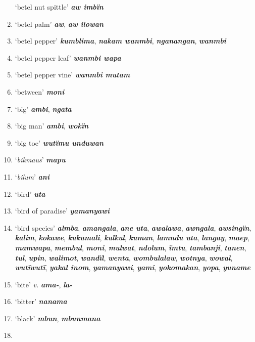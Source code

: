 \begin{enumerate}[noitemsep, label={}, align=left, widest=190, labelsep=1ex,leftmargin=*,itemindent=-10pt]
‘betel nut spittle’ \textbf{\textit{aw imbïn}} \item
‘betel palm’ \textbf{\textit{aw}}, \textbf{\textit{aw ilowan}} \item
‘betel pepper’ \textbf{\textit{kumblima}}, \textbf{\textit{nakam wanmbi}}, \textbf{\textit{nganangan}}, \textbf{\textit{wanmbi}} \item
‘betel pepper leaf’ \textbf{\textit{wanmbi wapa}} \item
‘betel pepper vine’ \textbf{\textit{wanmbi mutam}} \item
‘between’ \textbf{\textit{moni}} \item
‘big’ \textbf{\textit{ambi}}, \textbf{\textit{ngata}} \item
‘big man’ \textbf{\textit{ambi}}, \textbf{\textit{wokïn}} \item
‘big toe’ \textbf{\textit{wutïmu unduwan}} \item
‘\textit{bikmaus}’ \textbf{\textit{mapu}} \item
‘\textit{bilum}’ \textbf{\textit{ani}} \item
‘bird’ \textbf{\textit{uta}} \item
‘bird of paradise’ \textbf{\textit{yamanyawi}} \item
‘bird species’ \textbf{\textit{almba}}, \textbf{\textit{amangala}}, \textbf{\textit{ane uta}}, \textbf{\textit{awalawa}}, \textbf{\textit{awngala}}, \textbf{\textit{awsingïn}}, \linebreak \textbf{\textit{kalim}}, \textbf{\textit{kokawe}}, \textbf{\textit{kukumali}}, \textbf{\textit{kulkul}}, \textbf{\textit{kuman}}, \textbf{\textit{lamndu uta}}, \textbf{\textit{langay}}, \textbf{\textit{maep}}, \textbf{\textit{mamwapa}}, \textbf{\textit{membul}}, \textbf{\textit{moni}}, \textbf{\textit{mulwat}}, \textbf{\textit{ndolum}}, \textbf{\textit{ïmtu}}, \textbf{\textit{tambanji}}, \textbf{\textit{tanen}}, \textbf{\textit{tul}}, \textbf{\textit{upin}}, \textbf{\textit{walimot}}, \textbf{\textit{wandïl}}, \textbf{\textit{wenta}}, \textbf{\textit{wombulalaw}}, \textbf{\textit{wotnya}}, \textbf{\textit{wowal}}, \textbf{\textit{wutïwutï}}, \textbf{\textit{yakal inom}}, \textbf{\textit{yamanyawi}}, \textbf{\textit{yami}}, \textbf{\textit{yokomakan}}, \textbf{\textit{yopa}}, \textbf{\textit{yuname}} \item
‘bite’ \textit{v.} \textbf{\textit{ama-}}, \textbf{\textit{la-}} \item
‘bitter’ \textbf{\textit{nanama}} \item
‘black’ \textbf{\textit{mbun}}, \textbf{\textit{mbunmana}} \item

\end{enumerate}

